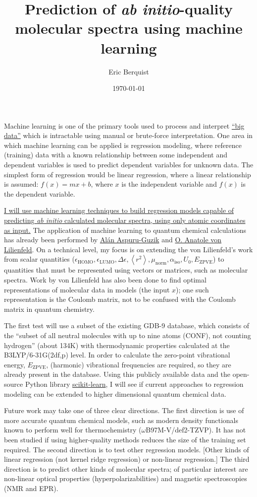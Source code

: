 \documentclass[12pt]{article}
\title{Prediction of \textit{ab initio}-quality molecular spectra using machine learning}
\author{Eric Berquist}
\date{\today}
\begin{document}
\maketitle

Machine learning is one of the primary tools used to process and interpret \href{https://en.wikipedia.org/wiki/Big_data}{``big data''} which is intractable using manual or brute-force interpretation. One area in which machine learning can be applied is regression modeling, where reference (training) data with a known relationship between some independent and dependent variables is used to predict dependent variables for unknown data. The simplest form of regression would be linear regression, where a linear relationship is assumed: \(f(x) = mx + b\), where \(x\) is the independent variable and \(f(x)\) is the dependent variable.

\ul{I will use machine learning techniques to build regression models capable of predicting \textit{ab initio} calculated molecular spectra, using only atomic coordinates as input.} The application of machine learning to quantum chemical calculations has already been performed by \href{http://aspuru.chem.harvard.edu/}{Al\'{a}n Aspuru-Guzik} and \href{http://www.chemie.unibas.ch/~anatole/}{O. Anatole von Lilienfeld}. On a technical level, my focus is on extending the von Lilienfeld's work from scalar quantities (\(\epsilon_{\text{HOMO}}, \epsilon_{\text{LUMO}}, \Delta\epsilon, \left<r^2\right>, \mu_{\text{norm}}, \alpha_{\text{iso}}, U_{0}, E_{\text{ZPVE}}\)) to quantities that must be represented using vectors or matrices, such as molecular spectra. Work by von Lilienfeld has also been done to find optimal representations of molecular data in models (the input \(x\)); one such representation is the Coulomb matrix, not to be confused with the Coulomb matrix in quantum chemistry.

The first test will use a subset of the existing GDB-9 database, which consists of the ``subset of all neutral molecules with up to nine atoms (CONF), not counting hydrogen'' (about 134K) with thermodynamic properties calculated at the B3LYP/6-31G(2df,p) level. In order to calculate the zero-point vibrational energy, \(E_{\text{ZPVE}}\), (harmonic) vibrational frequencies are required, so they are already present in the database. Using this publicly available data and the open-source Python library \href{http://scikit-learn.org/stable/}{scikit-learn}, I will see if current approaches to regression modeling can be extended to higher dimensional quantum chemical data.

Future work may take one of three clear directions. The first direction is use of more accurate quantum chemical models, such as modern density functionals known to perform well for thermochemistry (\(\omega\)B97M-V/def2-TZVP). It has not been studied if using higher-quality methods reduces the size of the training set required. The second direction is to test other regression models. [Other kinds of linear regression (not kernel ridge regression) or non-linear regression.] The third direction is to predict other kinds of molecular spectra; of particular interest are non-linear optical properties (hyperpolarizabilities) and magnetic spectroscopies (NMR and EPR).
\end{document}
